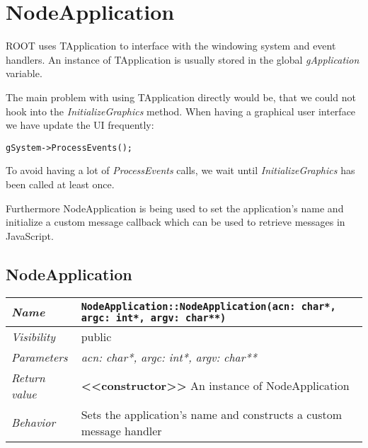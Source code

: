 \chapter{NodeApplication}
ROOT uses TApplication to interface with the windowing system and event handlers.
An instance of TApplication is usually stored in the global \textit{gApplication} variable.

The main problem with using TApplication directly would be, that we could not hook into the \textit{InitializeGraphics} method.
When having a graphical user interface we have update the UI frequently:
\begin{verbatim}
gSystem->ProcessEvents();
\end{verbatim}
To avoid having a lot of \textit{ProcessEvents} calls, we wait until \textit{InitializeGraphics} has been called at least once.

Furthermore NodeApplication is being used to set the application's name and initialize a custom message callback which can be used to retrieve messages in JavaScript.

\section{NodeApplication}
\begin{longtable}{p{3cm} @{\hskip 1cm} p{12cm}}
 \hline
\textit{Name} & \texttt{NodeApplication::NodeApplication(acn: char*, argc: int*, argv: char**)}\\
\hline
 \textit{Visibility} & public\\
\hline
\textit{Parameters} & \textit{acn: char*, argc: int*, argv: char**}\\
\hline
\textit{Return value} & \textbf{<<constructor>>} An instance of NodeApplication\\
  \hline
 \textit{Behavior} & Sets the application's name and constructs a custom message handler \\
\hline
\end{longtable} \pagebreak
